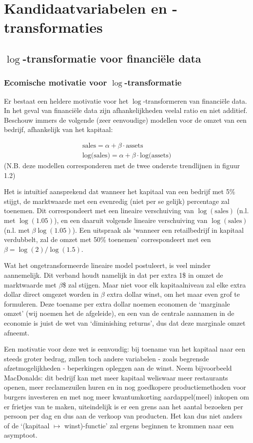 \documentclass[a4paper, notitlepage]{report}
\begin{document}
\chapter{Kandidaatvariabelen en -transformaties}

\section{$\log$-transformatie voor financi\"ele data}
\subsection{Ecomische motivatie voor $\log$-transformatie}
  Er bestaat een heldere motivatie voor het $\log$-transformeren van financi\"ele data. In het geval van financi\"ele data zijn afhankelijkheden veelal ratio en niet additief. Beschouw immers de volgende (zeer eenvoudige) modellen voor de omzet van een bedrijf, afhankelijk van het kapitaal:

\begin{align}
  \text{sales} = \alpha + \beta \cdot \text{assets} \\
  \text{log(sales)} = \alpha + \beta \cdot \text{log(assets)}
\end{align}
  (N.B. deze modellen corresponderen met de twee onderste trendlijnen in figuur 1.2)
  
  Het is intu\"itief aansprekend dat wanneer het kapitaal van een bedrijf met 5\% stijgt, de marktwaarde met een evenredig (niet per se gelijk) percentage zal toenemen. Dit correspondeert met een lineaire verschuiving van $\log(\text{sales})$ (n.l. met $\log(1.05)$), en een daaruit volgende lineaire verschuiving van $\log(\text{sales})$ (n.l. met $\beta \log(1.05)$). Een uitspraak als `wanneer een retailbedrijf in kapitaal verdubbelt, zal de omzet met 50\% toenemen' correspondeert met een $\beta = \log(2)/\log(1.5)$.
  
  Wat het ongetransformeerde lineaire model postuleert, is veel minder aannemelijk. Dit verband houdt namelijk in dat per extra 1\$ in omzet de marktwaarde met $\beta$\$ zal stijgen. Maar niet voor elk kapitaalniveau zal elke extra dollar direct omgezet worden in $\beta$ extra dollar winst, om het maar even grof te formuleren. Deze toename per extra dollar noemen economen de `marginale omzet' (wij noemen het de afgeleide), en een van de centrale aannamen in de economie is juist de wet van `diminishing returns', dus dat deze marginale omzet afneemt. 
  
  Een motivatie voor deze wet is eenvoudig: bij toename van het kapitaal naar een steeds groter bedrag, zullen toch andere variabelen - zoals begrensde afzetmogelijkheden - beperkingen opleggen aan de winst. Neem bijvoorbeeld MacDonalds: dit bedrijf kan met meer kapitaal weliswaar meer restaurants openen, meer reclamezuilen huren en in nog goedkopere productiemethoden voor burgers investeren en met nog meer kwantumkorting aardappel(meel) inkopen om er frietjes van te maken, uiteindelijk is er een grens aan het aantal bezoeken per persoon per dag en dus aan de verkoop van producten. Het kan dus niet anders of de `(kapitaal $\mapsto$ winst)-functie' zal ergens beginnen te krommen naar een asymptoot.
  
\end{document}
